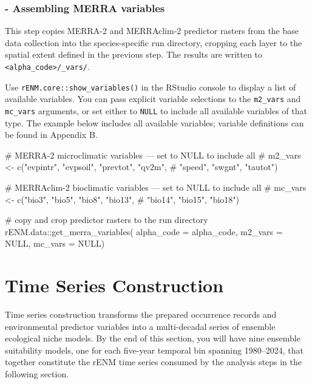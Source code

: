 \documentclass[
  letterpaper,
  DIV=11,
  numbers=noendperiod]{scrartcl}
\newenvironment{Shaded}{\begin{snugshade}}{\end{snugshade}}
\newcommand{\AttributeTok}[1]{\textcolor[rgb]{0.40,0.45,0.13}{#1}}
\newcommand{\CommentTok}[1]{\textcolor[rgb]{0.37,0.37,0.37}{#1}}
\newcommand{\ConstantTok}[1]{\textcolor[rgb]{0.56,0.35,0.01}{#1}}
\newcommand{\FunctionTok}[1]{\textcolor[rgb]{0.28,0.35,0.67}{#1}}
\newcommand{\NormalTok}[1]{\textcolor[rgb]{0.00,0.23,0.31}{#1}}
\newcommand{\SpecialCharTok}[1]{\textcolor[rgb]{0.37,0.37,0.37}{#1}}
\begin{document}
\subsubsection{- Assembling MERRA
variables}\label{assembling-merra-variables}

This step copies MERRA-2 and MERRAclim-2 predictor rasters from the base
data collection into the species-specific run directory, cropping each
layer to the spatial extent defined in the previous step. The results
are written to \texttt{\textless{}alpha\_code\textgreater{}/\_vars/}.

Use \texttt{rENM.core::show\_variables()} in the RStudio console to
display a list of available variables. You can pass explicit variable
selections to the \texttt{m2\_vars} and \texttt{mc\_vars} arguments, or
set either to \texttt{NULL} to include all available variables of that
type. The example below includes all available variables; variable
definitions can be found in Appendix B.

\begin{Shaded}
\begin{Highlighting}[]
\CommentTok{\# MERRA{-}2 microclimatic variables — set to NULL to include all}
\CommentTok{\# m2\_vars \textless{}{-} c("evpintr", "evpsoil", "prevtot", "qv2m",}
\CommentTok{\#              "speed", "swgnt", "tautot")}

\CommentTok{\# MERRAclim{-}2 bioclimatic variables — set to NULL to include all}
\CommentTok{\# mc\_vars \textless{}{-} c("bio3", "bio5", "bio8", "bio13",}
\CommentTok{\#              "bio14", "bio15", "bio18")}

\CommentTok{\# copy and crop predictor rasters to the run directory}
\NormalTok{rENM.data}\SpecialCharTok{::}\FunctionTok{get\_merra\_variables}\NormalTok{(}
  \AttributeTok{alpha\_code =}\NormalTok{ alpha\_code,}
  \AttributeTok{m2\_vars =} \ConstantTok{NULL}\NormalTok{,}
  \AttributeTok{mc\_vars =} \ConstantTok{NULL}\NormalTok{)}
\end{Highlighting}
\end{Shaded}

\section{Time Series Construction}\label{time-series-construction}

Time series construction transforms the prepared occurrence records and
environmental predictor variables into a multi-decadal series of
ensemble ecological niche models. By the end of this section, you will
have nine ensemble suitability models, one for each five-year temporal
bin spanning 1980--2024, that together constitute the rENM time series
consumed by the analysis steps in the following section.
\end{document}
